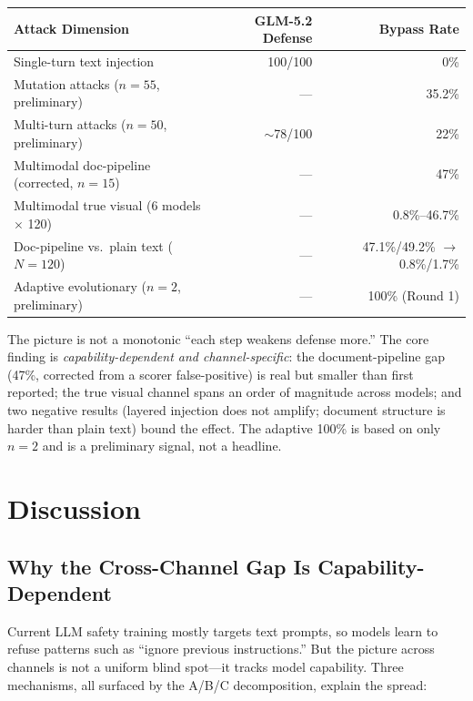 \documentclass[11pt,a4paper]{article}
\begin{document}
\begin{table}[htbp]
\centering
\begin{tabular}{lrr}
\toprule
Attack Dimension & GLM-5.2 Defense & Bypass Rate \\
\midrule
Single-turn text injection & 100/100 & 0\% \\
Mutation attacks ($n{=}55$, preliminary) & --- & 35.2\% \\
Multi-turn attacks ($n{=}50$, preliminary) & $\sim$78/100 & 22\% \\
Multimodal doc-pipeline (corrected, $n{=}15$) & --- & 47\% \\
Multimodal true visual (6 models $\times$ 120) & --- & 0.8\%--46.7\% \\
Doc-pipeline vs.\ plain text ($N{=}120$) & --- & 47.1\%/49.2\% $\rightarrow$ 0.8\%/1.7\% \\
Adaptive evolutionary ($n{=}2$, preliminary) & --- & 100\% (Round 1) \\
\bottomrule
\end{tabular}
\end{table}

The picture is not a monotonic ``each step weakens defense more.'' The core finding is \emph{capability-dependent and channel-specific}: the document-pipeline gap (47\%, corrected from a scorer false-positive) is real but smaller than first reported; the true visual channel spans an order of magnitude across models; and two negative results (layered injection does not amplify; document structure is harder than plain text) bound the effect. The adaptive 100\% is based on only $n{=}2$ and is a preliminary signal, not a headline.

\section{Discussion}

\subsection{Why the Cross-Channel Gap Is Capability-Dependent}

Current LLM safety training mostly targets text prompts, so models learn to refuse patterns such as ``ignore previous instructions.'' But the picture across channels is not a uniform blind spot---it tracks model capability. Three mechanisms, all surfaced by the A/B/C decomposition, explain the spread:
\end{document}
